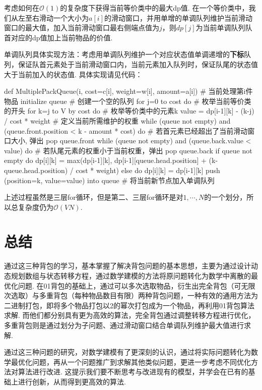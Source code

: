 \documentclass[12pt, a4paper, oneside]{ctexart}
\numberwithin{equation}{section}  %
\def\O{\mathcal{O}}         %
\begin{document}
考虑如何在$\O(1)$的复杂度下获得当前等价类中的最大dp值. 在一个等价类中，我们从左至右滑动一个大小为$a[i]$的滑动窗口，并用单增的单调队列维护当前滑动窗口的最大值，加入当前滑动窗口最右侧端点值为$j$，则$dp[j]$为当前单调队列队首对应的dp值加上当前物品的价值.

单调队列具体实现方法：考虑用单调队列维护一个对应状态值单调递增的\textbf{下标}队列，保证队首元素处于当前滑动窗口内，当前元素加入队列时，保证队尾的状态值大于当前加入的状态值. 具体实现请见代码：
\begin{pythoncode}
def MultiplePackQueue(i, cost=c[i], weight=w[i], amount=a[i])  # 当前处理第i件物品
    initialize queue  # 创建一个空的队列
    for j=0 to cost do  # 枚举当前等价类的开头
        for k=j to V by cost do  # 枚举等价类中的元素k
            value = dp[i-1][k] - (k-j) / cost * weight  # 定义当前所需维护的权重
            while (queue not empty) and (queue.front.position < k - amount * cost) do  # 若首元素已经超出了当前滑动窗口大小, 弹出
                pop queue.front
            while (queue not empty) and (queue.back.value < value) do  # 若队尾元素的权重小于当前权重，弹出
                pop queue.back
            if queue not empty do
                dp[i][k] = max(dp[i-1][k], dp[i-1][queue.head.position] + (k-queue.head.position) / cost * weight)
            else do
                dp[i][k] = dp[i-1][k]
            push (position=k, value=value) into queue  # 将当前新节点加入单调队列
\end{pythoncode}
上述过程虽然是三层for循环，但是第二、三层for循环是对$1,\cdots,N$的一个划分，所以总复杂度仍为$\O(VN)$.
\section*{总结}
通过这三种背包的学习，基本掌握了解决背包问题的基本思想，主要为通过设计动态规划数组与状态转移方程，通过数学建模的方法将原问题转化为数学中离散的最优化问题. 在01背包的基础上，通过可以多次选取物品，衍生出完全背包（可无限次选取）与多重背包（每种物品数目有限）两种背包问题，一种有效的通用方法为二进制打包，即将多个物品打包以2的幂次打包成为一个物品，再利用01背包算法求解. 而他们都分别具有更为高效的算法，完全背包通过调整转移方程进行优化，多重背包则是通过划分为子问题、通过滑动窗口结合单调队列维护最大值进行求解.

通过这三种问题的研究，对数学建模有了更深刻的认识，通过将实际问题转化为数学最优化问题，再从一个问题推广到求解其他类似问题，更进一步考虑不同优化方法对算法进行改进. 这提示我们要不断思考与改进现有的模型，并学会在已有的基础上进行创新，从而得到更高效的算法.
\end{document}
